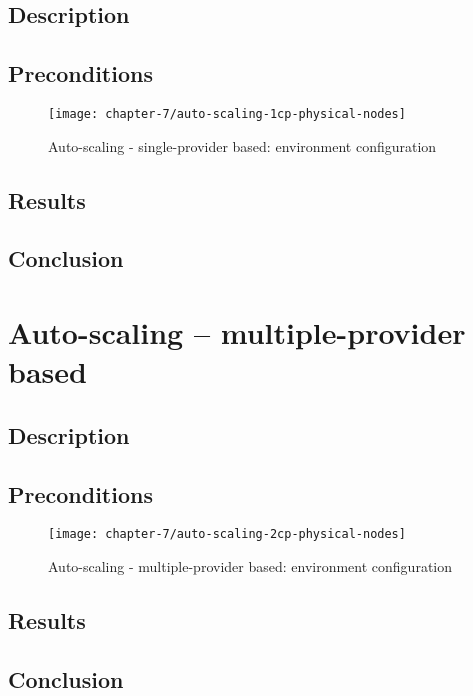 \subsection*{Description}
\subsection*{Preconditions}
\begin{figure}[!ht]
  \begin{center}
    \texttt{[image: chapter-7/auto-scaling-1cp-physical-nodes]}
  \end{center}
  \caption{Auto-scaling - single-provider based: environment configuration}
  \label{eval:auto-scaling-1cp-physical-nodes}
\end{figure}

\subsection*{Results}
\subsection*{Conclusion}

\section{Auto-scaling -- multiple-provider based}
\subsection*{Description}
\subsection*{Preconditions}
\begin{figure}[!ht]
  \begin{center}
    \texttt{[image: chapter-7/auto-scaling-2cp-physical-nodes]}
  \end{center}
  \caption{Auto-scaling - multiple-provider based: environment configuration}
  \label{eval:auto-scaling-1cp-physical-nodes}
\end{figure}

\subsection*{Results}
\subsection*{Conclusion}

